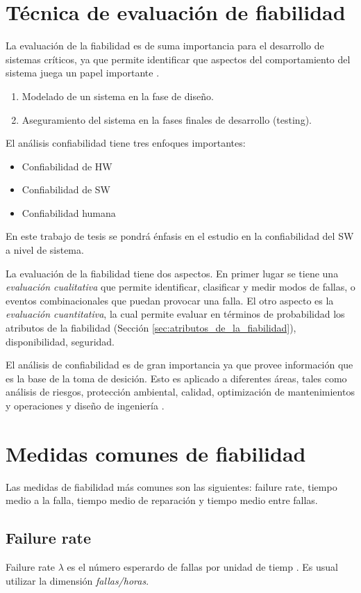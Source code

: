 \section{Técnica de evaluación de fiabilidad}
La evaluación de la fiabilidad es de suma importancia para el desarrollo de sistemas críticos, ya
que permite identificar que aspectos del comportamiento del sistema juega un papel importante
\citep{FTDesign}.

\begin{enumerate}
 \item Modelado de un sistema en la fase de diseño.
 \item Aseguramiento del sistema en la fases finales de desarrollo (testing).
\end{enumerate}
El análisis confiabilidad tiene tres enfoques importantes:
\begin{itemize}
  \item Confiabilidad de \ac{HW}
  \item Confiabilidad de \ac{SW}
  \item Confiabilidad humana
\end{itemize}
En este trabajo de tesis se pondrá énfasis en el estudio en la confiabilidad del \ac{SW} a nivel de sistema.

La evaluación de la fiabilidad tiene dos aspectos. En primer lugar se tiene una \textit{evaluación
cualitativa} que permite identificar, clasificar y medir modos de fallas, o eventos combinacionales
que puedan provocar una falla. El otro aspecto es la \textit{evaluación cuantitativa}, la cual
permite evaluar en términos de probabilidad los atributos de la fiabilidad (Sección \ref{sec:atributos_de_la_fiabilidad}), disponibilidad, seguridad.

El análisis de confiabilidad es de gran importancia ya que provee información que es la base de la toma de desición. Esto es aplicado a diferentes áreas, tales como análisis de riesgos, protección ambiental, calidad, optimización de mantenimientos y operaciones y diseño de ingeniería \citep{Rausand04}.

\section{Medidas comunes de fiabilidad}
Las medidas de fiabilidad más comunes son las siguientes: failure rate, tiempo medio a la falla,
tiempo medio de reparación y tiempo medio entre fallas.

\subsection{Failure rate}
Failure rate $\lambda$ es el número esperardo de fallas por unidad de tiemp \citep{FTDesign}. Es
usual utilizar la dimensión \textit{fallas/horas}.

